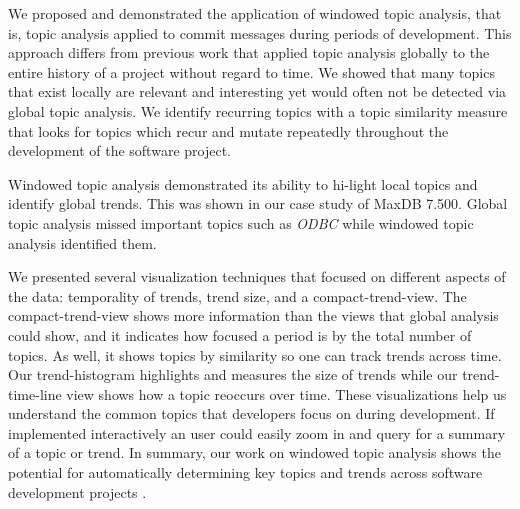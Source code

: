 \documentclass[times, 10pt,twocolumn]{article}
\newcommand{\shrinkit}{\vspace*{-.3em}}
\begin{document}
\shrinkit
{}
\shrinkit








We proposed and demonstrated the application of windowed topic
analysis, that is, topic analysis applied to commit messages during
periods of development. This approach differs from previous work that
applied topic analysis globally to the entire history of a
project without regard to time. We showed that many topics that exist
locally are relevant and interesting yet would often not be detected
via global topic analysis. We identify recurring topics with a topic
similarity measure that looks for topics which recur and mutate
repeatedly throughout the development of the software project.

Windowed topic analysis demonstrated its ability to hi-light local topics
and identify global trends. This was shown in our case study of MaxDB
7.500. Global topic analysis missed important topics such as
\emph{ODBC} while windowed topic analysis identified them.


We presented several visualization techniques that focused on
different aspects of the data: temporality of trends, trend size, and
a compact-trend-view. The compact-trend-view shows more
information than the views that global analysis could show, and it
indicates how focused a period is by the total number of topics. As
well, it shows topics by similarity so one can track trends across
time.  Our trend-histogram highlights and measures the
size of trends while our trend-time-line view shows how a topic
reoccurs over time. These visualizations help us  understand the common topics that developers focus on during
development. If implemented interactively an user could easily zoom in
and query for a summary of a topic or trend.
In summary, our work on windowed topic analysis shows the potential
for automatically determining key topics and trends across software
development projects .
\end{document}
